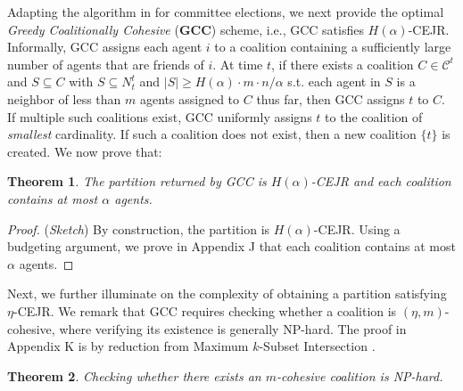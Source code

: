 \documentclass[letterpaper]{article}
\newtheorem{theorem}{Theorem}
\begin{document}
Adapting the algorithm in \cite[Section 5.2]{do2022online} for committee elections, we next provide the optimal \textit{Greedy Coalitionally Cohesive} (\textbf{GCC}) scheme, i.e., GCC satisfies $H(\alpha)$-CEJR. Informally, GCC assigns each agent $i$ to a coalition containing a sufficiently large number of agents that are friends of $i$. At time $t$, if there exists a coalition $C \in \mathcal{C}^t$ and $S \subseteq C$ with $S \subseteq N_t^t$ and $|S| \geq H(\alpha) \cdot m \cdot n/\alpha$ s.t. each agent in $S$ is a neighbor of less than $m$ agents assigned to $C$ thus far, then GCC assigns $t$ to $C$. If multiple such coalitions exist, GCC uniformly assigns $t$ to the coalition of \textit{smallest} cardinality. If such a coalition does not exist, then a new coalition $\{t\}$ is created. We now prove that:  \begin{theorem}
\label{thm:gcc}
The partition returned by GCC is $H(\alpha)$-CEJR and each coalition contains at most $\alpha$ agents.
\end{theorem}  \begin{proof}
(\textit{Sketch})
By construction, the partition is $H(\alpha)$-CEJR. Using a budgeting argument, we prove in Appendix J that each coalition contains at most $\alpha$ agents.
\end{proof}  Next, we further illuminate on the complexity of obtaining a partition satisfying $\eta$-CEJR. We remark that GCC requires checking whether a coalition is $(\eta, m)$-cohesive, where verifying its existence is generally NP-hard. The proof in Appendix K is by reduction from Maximum $k$-Subset Intersection \cite{xavier2012note}.  \begin{theorem}
\label{thm:cohesive np hard}
Checking whether there exists an $m$-cohesive coalition is NP-hard.

\end{theorem}
\end{document}
